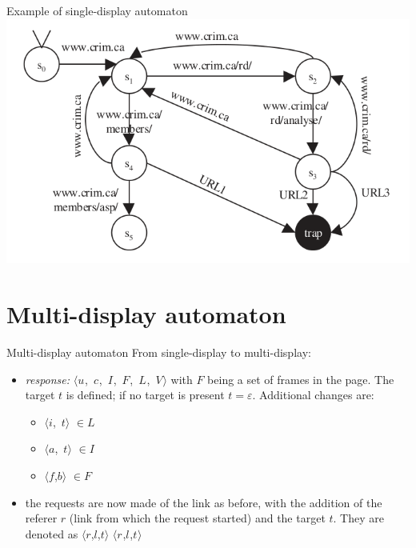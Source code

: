 \documentclass[usenames,dvipsnames]{beamer}
\newcommand{\tuple}[1]{\mbox{$\langle$#1$\rangle$}}
\newcommand{\reqmulti}[1][]{
  \ifthenelse{\equal{#1}{}} {\mbox{$\langle r$,$l$,$t\rangle$}}
  {\mbox{$\langle r_{#1}$,$l_{#1}$,$t_{#1}\rangle$}}
}
\newcommand{\resmulti}[1][]{
  \ifthenelse{\equal{#1}{}}{\mbox{$\langle u$, $c$, $I$, $F$, $L$, $V\rangle$}}
  {\mbox{$\langle u_{#1}$, $c_{#1}$, $I_{#1}$, $F_{#1}$, $L_{#1}$, $V_{#1}\rangle$}}
}
\theoremstyle{definition}
\begin{document}
\begin{frame}{Example of single-display automaton}
  \includegraphics[width=\textwidth]{../img/session_automaton_example.png}
\end{frame}

\section{Multi-display automaton}
\begin{frame}{Multi-display automaton}
  From single-display to multi-display:
  \begin{itemize}
    \item \textit{response:} \resmulti with $F$ being a set of frames in the page. The target $t$ is defined; if no target is present $t = \varepsilon$. Additional changes are:
      \begin{itemize}
        \item \tuple{$i$, $t$} $\in L$
        \item \tuple{$a$, $t$} $\in I$
        \item \tuple{$f$,$b$} $\in F$
      \end{itemize}
    \item the requests are now made of the link as before, with the addition of the referer $r$ (link from which the request started) and the target $t$. They are denoted as \reqmulti
  \end{itemize}
\end{frame}
\end{document}
